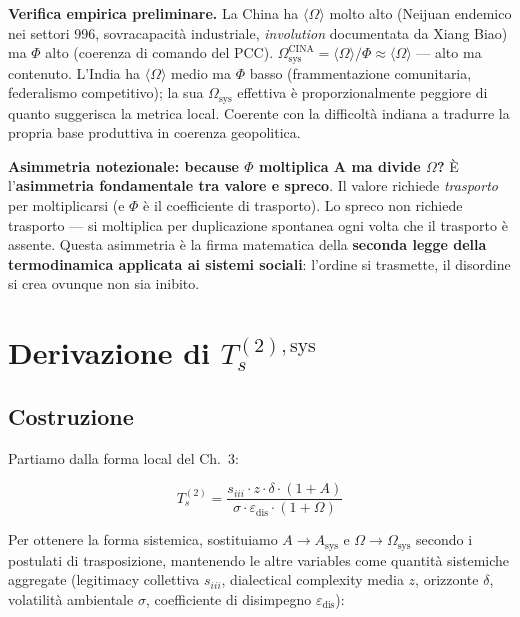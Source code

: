 \Proved{} \textbf{Verifica empirica preliminare.} La China ha
\(\langle \Omega \rangle\) molto alto (Neijuan endemico nei settori 996,
sovracapacità industriale, \emph{involution} documentata da Xiang Biao)
ma \(\Phi\) alto (coerenza di comando del PCC).
\(\Omega_{\text{sys}}^{\text{CINA}} = \langle\Omega\rangle/\Phi \approx \langle\Omega\rangle\)
--- alto ma contenuto. L'India ha \(\langle \Omega \rangle\) medio ma
\(\Phi\) basso (frammentazione comunitaria, federalismo competitivo); la
sua \(\Omega_{\text{sys}}\) effettiva è proporzionalmente peggiore di
quanto suggerisca la metrica local. Coerente con la difficoltà indiana
a tradurre la propria base produttiva in coerenza geopolitica.

\Conj{} \textbf{Asimmetria notezionale: because $\Phi$ moltiplica A ma divide
$\Omega$?} È l'\textbf{asimmetria fondamentale tra valore e spreco}. Il valore
richiede \emph{trasporto} per moltiplicarsi (e \(\Phi\) è il
coefficiente di trasporto). Lo spreco non richiede trasporto --- si
moltiplica per duplicazione spontanea ogni volta che il trasporto è
assente. Questa asimmetria è la firma matematica della \textbf{seconda
legge della termodinamica applicata ai sistemi sociali}: l'ordine si
trasmette, il disordine si crea ovunque non sia inibito.



\section{\texorpdfstring{Derivazione di
\(T_s^{(2),\text{sys}}\)}{Derivazione di T\_s\^{}\{(2),\textbackslash text\{sys\}\}}}\label{followszione-di-t_s2textsys}

\subsection{Costruzione}\label{costruzione}

Partiamo dalla forma local del Ch.~3:

\[
T_s^{(2)} = \frac{s_{iii} \cdot z \cdot \delta \cdot (1 + A)}{\sigma \cdot \varepsilon_{\text{dis}} \cdot (1 + \Omega)}
\]

Per ottenere la forma sistemica, sostituiamo \(A \to A_{\text{sys}}\) e
\(\Omega \to \Omega_{\text{sys}}\) secondo i postulati di trasposizione,
mantenendo le altre variables come quantità sistemiche aggregate
(legitimacy collettiva \(s_{iii}\), dialectical complexity media \(z\),
orizzonte \(\delta\), volatilità ambientale \(\sigma\), coefficiente di
disimpegno \(\varepsilon_{\text{dis}}\)):


